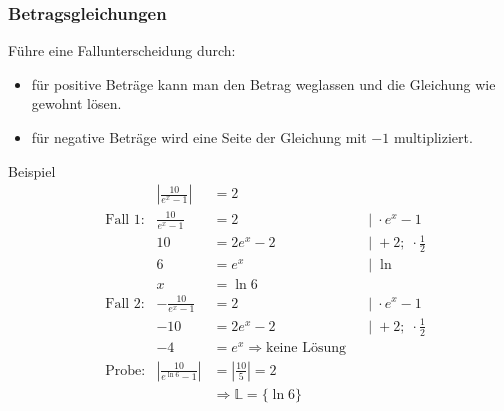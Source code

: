 \documentclass{article}
\begin{document}
\subsubsection*{Betragsgleichungen}
Führe eine Fallunterscheidung durch:
\begin{itemize}
    \item für positive Beträge kann man den Betrag weglassen und
    die Gleichung wie gewohnt lösen.
    \item für negative Beträge wird eine Seite der Gleichung mit
    $-1$ multipliziert.
\end{itemize}
\begin{boxx}[DarkBlue]{Beispiel}
    \begin{align*}
        && \left|\frac{10}{e^x-1}\right| &= 2 \\
        &\text{Fall 1:} & \frac{10}{e^x-1} &= 2 & &|\; \cdot e^x - 1 \\ 
        && 10 &= 2e^x - 2 & &|\; + 2 ;\; \cdot \frac{1}{2} \\
        && 6 &= e^x  & &|\; \ln\\
        && x &= \ln 6 \\
        &\text{Fall 2:} & -\frac{10}{e^x-1} &= 2 & &|\; \cdot e^x - 1 \\
        && -10 &= 2e^x - 2 & &|\; + 2 ;\; \cdot \frac{1}{2} \\
        && -4 &= e^x \Rightarrow \text{keine Lösung} \\
        &\text{Probe:} & \left|\frac{10}{e^{\ln 6}-1}\right| &= \left|\frac{10}{5}\right| = 2 \\
        && &\Rightarrow \mathbb{L} = \{\ln 6\}
    \end{align*}
\end{boxx}
\end{document}
